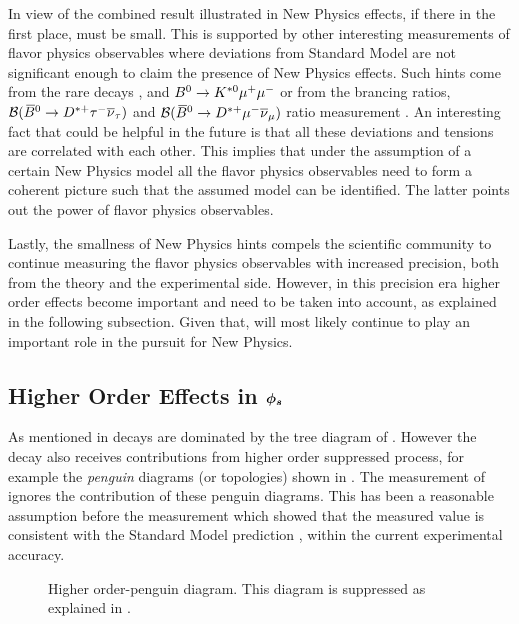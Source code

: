 In view of the combined \phis result illustrated in  New Physics effects, if there in the first place, must be small.
This is supported by other interesting measurements of flavor physics observables where deviations from Standard Model are not significant enough
to claim the presence of New Physics effects. Such hints come from the rare decays \Bsmm, \Bdmm \cite{CMS:2014xfa} and $B^0 \rightarrow K^{*0} \mu^+\mu^-$\cite{Aaij:2015oid}
or from the brancing ratios, ${\cal B}(\kern 0.18em\overline{\kern -0.18em B}{}^0 \rightarrow D^{*+} \tau^-\overline{\nu}_\tau)$ and ${\cal B}(\kern 0.18em\overline{\kern -0.18em B}{}^0 \rightarrow D^{*+} \mu^-\overline{\nu}_\mu)$ ratio measurement \cite{Aaij:2015yra}.
An interesting fact that could be helpful in the future is that all these deviations and tensions are
correlated with each other. This implies that under the assumption of a certain New Physics model all the flavor physics
observables need to form a coherent picture such that the assumed model can be identified.
The latter points out the power of flavor physics observables.

Lastly, the smallness of New Physics hints compels the scientific community to continue measuring the
flavor physics observables with increased precision, both from the theory and the experimental side.
However, in this precision era higher order effects become important and need to be taken into account,
as explained in the following subsection. Given that, \phis will most likely continue to play an important
role in the pursuit for New Physics.

\subsection{Higher Order Effects in $\boldsymbol{\phi_{s}}$}
\label{TheBsJpsiKstDecay}
As mentioned in  \BsJpsiPhi decays are dominated by the tree diagram of .
However the decay also receives contributions from higher order suppressed process, for example the
{\it penguin} diagrams (or topologies) shown in . The \phis measurement of 
ignores the contribution of these penguin diagrams. This has been a reasonable assumption before the \lhcb measurement
which showed that the measured  value is consistent with the Standard Model prediction ,
within the current experimental accuracy.

\begin{figure}[h]
  \centering
  {\sffamily }
  \caption{ Higher order-penguin diagram. This diagram is suppressed as explained in .}
  \label{bs2jpsiphi_peng}
\end{figure}

